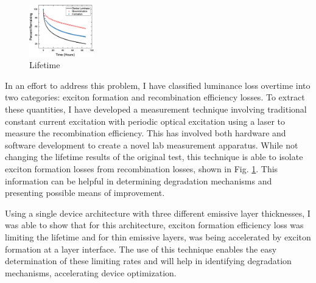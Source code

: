 \documentclass[a4paper,titlepage]{article}
\begin{document}
\begin{figure}
\vspace{-15pt}
\includegraphics[width=0.25\textwidth]{lifetime.eps}
\caption{Lifetime}
\label{lifetime}
\vspace{-20pt}
\end{figure}

In an effort to address this problem, I have classified luminance loss overtime into two categories:  exciton formation and recombination efficiency losses.  To extract these quantities, I have developed a measurement technique involving traditional constant current excitation with periodic optical excitation using a laser to measure the recombination efficiency.  This has involved both hardware and software development to create a novel lab measurement apparatus.  While not changing the lifetime results of the original test, this technique is able to isolate exciton formation losses from recombination losses, shown in Fig. \ref{lifetime}.  This information can be helpful in determining degradation mechanisms and presenting possible means of improvement.

Using a single device architecture with three different emissive layer thicknesses, I was able to show that for this architecture, exciton formation efficiency loss was limiting the lifetime and for thin emissive layers, was being accelerated by exciton formation at a layer interface.  The use of this technique enables the easy determination of these limiting rates and will help in identifying degradation mechanisms, accelerating device optimization.
\end{document}
